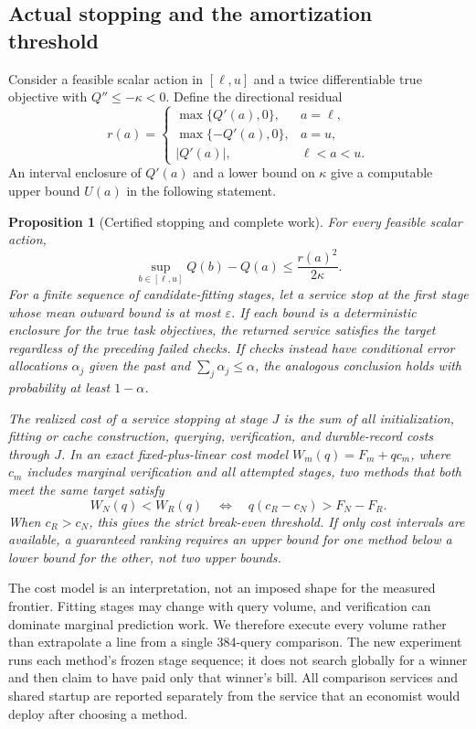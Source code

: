 \documentclass[ecta,nameyear,draft]{econsocart}
\newtheorem{proposition}[theorem]{Proposition}
\theoremstyle{definition}
\theoremstyle{remark}
\begin{document}
\subsection{Actual stopping and the amortization threshold}
Consider a feasible scalar action in $[\ell,u]$ and a twice differentiable
true objective with $Q''\leq-\kappa<0$. Define the directional residual
\[
 r(a)=\begin{cases}
 \max\{Q'(a),0\},&a=\ell,\\
 \max\{-Q'(a),0\},&a=u,\\
 |Q'(a)|,&\ell<a<u.
 \end{cases}
\]
An interval enclosure of $Q'(a)$ and a lower bound on $\kappa$ give a
computable upper bound $U(a)$ in the following statement.
\begin{proposition}[Certified stopping and complete work]\label{prop:r19stopping}
For every feasible scalar action,
\begin{equation}
 \sup_{b\in[\ell,u]}Q(b)-Q(a)\leq\frac{r(a)^2}{2\kappa}.
 \label{eq:r19residual}
\end{equation}
For a finite sequence of candidate-fitting stages, let a service stop at the
first stage whose mean outward bound is at most $\varepsilon$. If each bound
is a deterministic enclosure for the true task objectives, the returned
service satisfies the target regardless of the preceding failed checks.
If checks instead have conditional error allocations $\alpha_j$ given the
past and $\sum_j\alpha_j\leq\alpha$, the analogous conclusion holds with
probability at least $1-\alpha$.

The realized cost of a service stopping at stage $J$ is the sum of all
initialization, fitting or cache construction, querying, verification, and
durable-record costs through $J$. In an exact fixed-plus-linear cost model
$W_m(q)=F_m+q c_m$, where $c_m$ includes marginal verification and all
attempted stages, two methods that both meet the same target satisfy
\begin{equation}
 W_N(q)<W_R(q)\quad\Longleftrightarrow\quad
 q(c_R-c_N)>F_N-F_R.
 \label{eq:r19break}
\end{equation}
When $c_R>c_N$, this gives the strict break-even threshold. If only cost
intervals are available, a guaranteed ranking requires an upper bound for
one method below a lower bound for the other, not two upper bounds.
\end{proposition}

The cost model is an interpretation, not an imposed shape for the measured
frontier. Fitting stages may change with query volume, and verification can
dominate marginal prediction work. We therefore execute every volume rather
than extrapolate a line from a single 384-query comparison. The new experiment
runs each method's frozen stage sequence; it does not search globally for a
winner and then claim to have paid only that winner's bill. All comparison
services and shared startup are reported separately from the service that
an economist would deploy after choosing a method.
\end{document}
